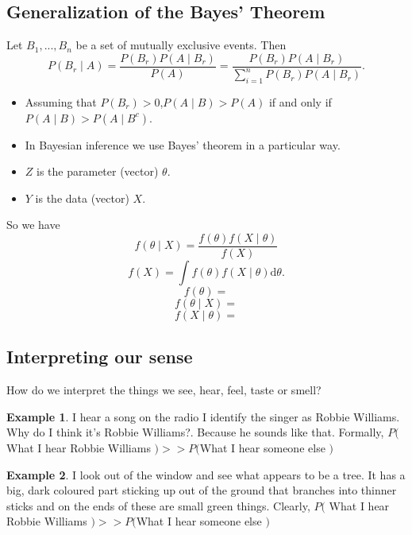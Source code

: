 \documentclass[lecture,12pt,]{pcms-l}
\numberwithin{section}{chapter}
\numberwithin{equation}{chapter}
\theoremstyle{plain}
\theoremstyle{definition}
\newtheorem{example}{Example}[section]
\theoremstyle{definition}
\begin{document}
\subsection{Generalization of the Bayes' Theorem}
Let $B_1,...,B_n$ be a set of mutually exclusive events. Then
\begin{equation}
P(B_r\mid A)=\frac{P(B_r)P(A\mid B_r)}{P(A)}=\frac{P(B_r)P(A\mid B_r)}{\sum_{i=1}^n P(B_r)P(A\mid B_r)}.
\end{equation}
\begin{itemize}
\item Assuming that $P(B_r)>0$,$P(A\mid B)>P(A)$ if and only if $P(A\mid B)>P(A\mid B^c)$.
\item In Bayesian inference we use Bayes' theorem in a particular way.
\item $Z$ is the parameter (vector) $\theta$.
\item $Y$ is the data (vector) $X$.
\end{itemize}
So we have 
\begin{equation}
f(\theta\mid X)=\frac{f(\theta)f(X\mid \theta)}{f(X)}
\end{equation}
\begin{equation}
f(X)=\int f(\theta)f(X\mid \theta)\mathrm{d}\theta.
\end{equation}
\begin{equation}
f(\theta)=
\end{equation}
\begin{equation}
f(\theta\mid X)=
\end{equation}
\begin{equation}
f(X\mid \theta)=
\end{equation}
\subsection{Interpreting our sense} 
How do we interpret the things we see, hear, feel, taste or smell?
\begin{example}
I hear a song on the radio I identify the singer as Robbie Williams. Why do I think it's Robbie Williams?. Because he sounds like that. Formally, $P($ What I hear Robbie Williams $)>>P($What I hear someone else $)$
\end{example}
\begin{example}
I look out of the window and see what appears to be a tree. It has a big, dark coloured part sticking up out of the ground that branches into thinner sticks and on the ends of these are small green things. Clearly, $P($ What I hear Robbie Williams $)>>P($What I hear someone else $)$
\end{example}
\vfill
\eject
\end{document}
